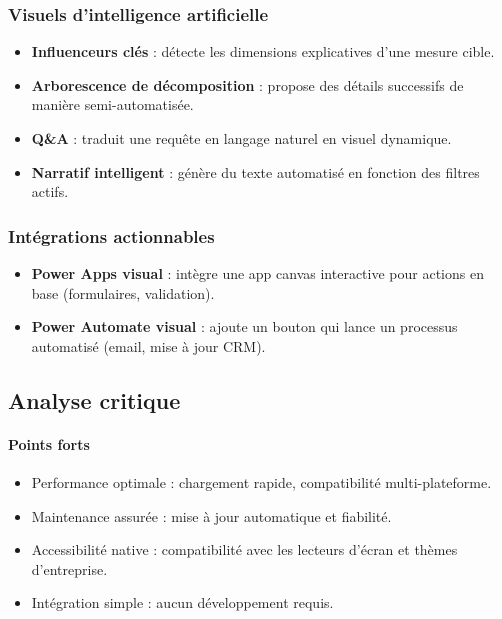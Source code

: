 \subsubsection{Visuels d'intelligence artificielle}
\begin{itemize}
  \item \textbf{Influenceurs clés} : détecte les dimensions explicatives d’une mesure cible.
  \item \textbf{Arborescence de décomposition} : propose des détails successifs de manière semi-automatisée.
  \item \textbf{Q\&A} : traduit une requête en langage naturel en visuel dynamique.
  \item \textbf{Narratif intelligent} : génère du texte automatisé en fonction des filtres actifs.
\end{itemize}

\subsubsection{Intégrations actionnables}
\begin{itemize}
  \item \textbf{Power Apps visual} : intègre une app canvas interactive pour actions en base (formulaires, validation).
  \item \textbf{Power Automate visual} : ajoute un bouton qui lance un processus automatisé (email, mise à jour CRM).
\end{itemize}

\subsection*{Analyse critique}

\paragraph{Points forts}
\begin{itemize}
  \item Performance optimale : chargement rapide, compatibilité multi-plateforme.
  \item Maintenance assurée : mise à jour automatique et fiabilité.
  \item Accessibilité native : compatibilité avec les lecteurs d'écran et thèmes d'entreprise.
  \item Intégration simple : aucun développement requis.
\end{itemize}

